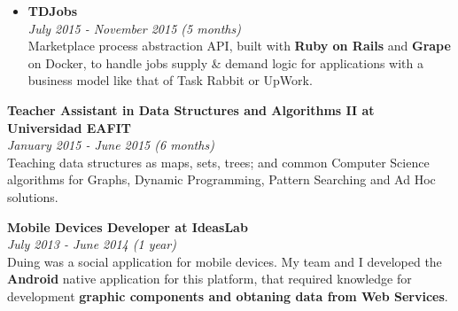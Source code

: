 \documentclass[margin, 10pt]{res} %
\begin{document}
\begin{resume}
\begin{itemize}
  \item \textbf{TDJobs} \\
        \textit{July 2015 - November 2015 (5 months)} \\
        Marketplace process abstraction API, built with \textbf{Ruby on Rails} and \textbf{Grape} on
        Docker, to handle jobs supply \& demand logic for applications with a business model like
        that of Task Rabbit or UpWork. \\
\end{itemize}

\textbf{Teacher Assistant in Data Structures and Algorithms II at Universidad EAFIT} \\
\textit{January 2015 - June 2015 (6 months)} \\
Teaching data structures as maps, sets, trees; and common Computer Science algorithms for Graphs,
Dynamic Programming, Pattern Searching and Ad Hoc solutions.

\textbf{Mobile Devices Developer at IdeasLab} \\
\textit{July 2013 - June 2014 (1 year)} \\
Duing was a social application for mobile devices. My team and I developed the \textbf{Android}
native application for this platform, that required knowledge for development \textbf{graphic
components and obtaning data from Web Services}. \\


\end{resume}
\end{document}
